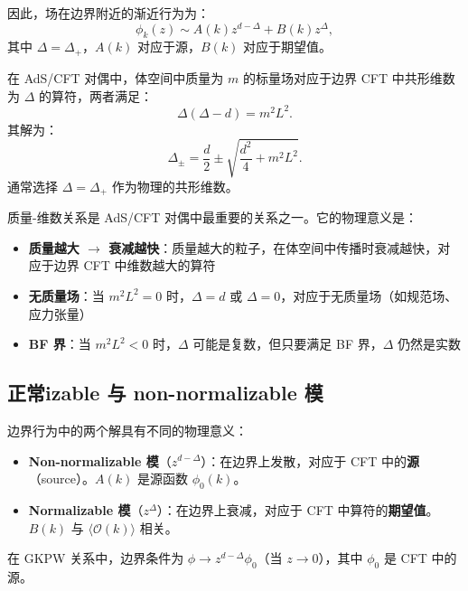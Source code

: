 因此，场在边界附近的渐近行为为：
\begin{equation}
    \phi_k(z) \sim A(k) z^{d-\Delta} + B(k) z^\Delta,
\end{equation}
其中 $\Delta = \Delta_+$，$A(k)$ 对应于源，$B(k)$ 对应于期望值。

\begin{theorem}[质量-维数关系]
在 AdS/CFT 对偶中，体空间中质量为 $m$ 的标量场对应于边界 CFT 中共形维数为 $\Delta$ 的算符，两者满足：
\begin{equation}
    \Delta(\Delta - d) = m^2 L^2.
\end{equation}
其解为：
\begin{equation}
    \Delta_\pm = \frac{d}{2} \pm \sqrt{\frac{d^2}{4} + m^2 L^2}.
\end{equation}
通常选择 $\Delta = \Delta_+$ 作为物理的共形维数。
\end{theorem}

\begin{note}[物理意义]
质量-维数关系是 AdS/CFT 对偶中最重要的关系之一。它的物理意义是：
\begin{itemize}
    \item \textbf{质量越大 $\to$ 衰减越快}：质量越大的粒子，在体空间中传播时衰减越快，对应于边界 CFT 中维数越大的算符
    \item \textbf{无质量场}：当 $m^2 L^2 = 0$ 时，$\Delta = d$ 或 $\Delta = 0$，对应于无质量场（如规范场、应力张量）
    \item \textbf{BF 界}：当 $m^2 L^2 < 0$ 时，$\Delta$ 可能是复数，但只要满足 BF 界，$\Delta$ 仍然是实数
\end{itemize}
\end{note}

\subsection{正常izable 与 non-normalizable 模}

边界行为中的两个解具有不同的物理意义：
\begin{itemize}
    \item \textbf{Non-normalizable 模}（$z^{d-\Delta}$）：在边界上发散，对应于 CFT 中的\textbf{源}（source）。$A(k)$ 是源函数 $\phi_0(k)$。
    \item \textbf{Normalizable 模}（$z^\Delta$）：在边界上衰减，对应于 CFT 中算符的\textbf{期望值}。$B(k)$ 与 $\langle \mathcal{O}(k) \rangle$ 相关。
\end{itemize}

在 GKPW 关系中，边界条件为 $\phi \to z^{d-\Delta} \phi_0$（当 $z \to 0$），其中 $\phi_0$ 是 CFT 中的源。

